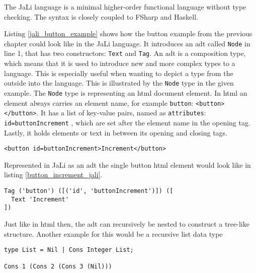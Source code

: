The JaLi language is a minimal higher-order functional language without type checking. The syntax is closely coupled to FSharp and Haskell.


    
Listing \ref{jali_button_example} shows how the button example from the previous chapter could look like in the JaLi language.
It introduces an \gls{adt} called \texttt{Node} in line 1, that has two constructors: \texttt{Text} and \texttt{Tag}. An \gls{adt} is a composition type, which means that it is used to introduce new and more complex types to a language. This is especially useful when wanting to depict a type from the outside into the language. This is illustrated by the \texttt{Node} type in the given example. The \texttt{Node} type is representing an \gls{html} document element. In \gls{html} an element always carries an element name, for example \texttt{button}: \texttt{<button></button>}. It has a list of key-value pairs, named as \texttt{attributes}: \texttt{id=buttonIncrement} , which are set after the element name in the opening tag. Lastly, it holds elements or text in between its opening and closing tags.

\begin{lstlisting}[columns=fullflexible, label={button_increment_html}, language=JaLi, caption=Button increment in HTML]
<button id=buttonIncrement>Increment</button>
\end{lstlisting}

Represented in JaLi as an \gls{adt} the single button \gls{html} element would look like in listing \ref{button_increment_jali}.

\begin{lstlisting}[columns=fullflexible, label={button_increment_jali}, language=JaLi, caption=Button increment in JaLi as ADT]
Tag ('button') ([('id', 'buttonIncrement')]) ([
  Text 'Increment'
])
\end{lstlisting}

Just like in \gls{html} then, the \gls{adt} can recursively be nested to construct a tree-like structure.
Another example for this would be a recursive list data type

\begin{lstlisting}[columns=fullflexible, label={recursive_list}, language=JaLi, caption=Recursive list data type]
type List = Nil | Cons Integer List;

Cons 1 (Cons 2 (Cons 3 (Nil)))
\end{lstlisting}

